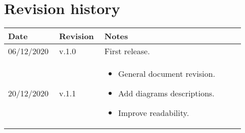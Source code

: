 \chapter*{Revision history}

\begin{center}
	\begin{tabular}{@{}p{0.18\linewidth} p{0.18\linewidth} p{0.57\linewidth}@{}}
		\toprule
		\textbf{Date} & \textbf{Revision} & \textbf{Notes}\\
		\midrule
		06/12/2020 & v.1.0 & First release.\\
		20/12/2020 & v.1.1 & \begin{itemize}[label={--},leftmargin=.4cm,noitemsep,topsep=0pt,before=\vspace{-3.5mm},after=\vspace{-4mm}]
			\item General document revision.
			\item Add diagrams descriptions.
			\item Improve readability.
		\end{itemize}\\
		\bottomrule
	\end{tabular}
\end{center}